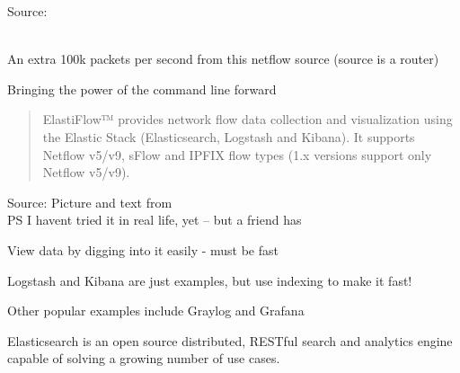 \documentclass[Screen16to9,17pt]{foils}
\begin{document}
Source: \\{\footnotesize
{}\\
}






\centerline{An extra 100k packets per second from this netflow source (source is a router)}




\centerline{Bringing the power of the command line forward}




\begin{quote}
  ElastiFlow™ provides network flow data collection and visualization using the Elastic Stack (Elasticsearch, Logstash and Kibana). It supports Netflow v5/v9, sFlow and IPFIX flow types (1.x versions support only Netflow v5/v9).
\end{quote}
Source: Picture and text from  \\
PS I havent tried it in real life, yet -- but a friend has







\begin{list1}
\item View data by digging into it easily - must be fast
\item Logstash and Kibana are just examples, but use indexing to make it fast!
\item Other popular examples include Graylog and Grafana
\end{list1}



Elasticsearch is an open source distributed, RESTful search and analytics engine capable of solving a growing number of use cases.
\end{document}
